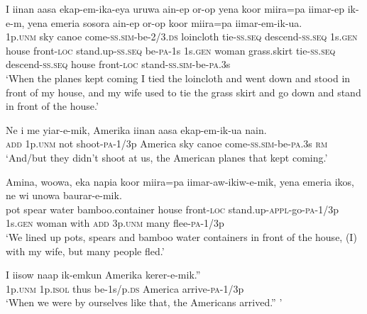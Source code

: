 \ea
\gll  I  iinan  aasa  ekap-em-ika-eya  uruwa  ain-ep             or-op  yena  koor  miira=pa  iimar-ep                     ik-e-m,  yena  emeria  sosora  ain-ep  or-op                        koor  miira=pa  iimar-em-ik-ua. \\
1p.\textsc{unm}  sky  canoe  come-\textsc{ss}.\textsc{sim}-be-2/3.\textsc{ds}  loincloth  tie-\textsc{ss.seq} descend-\textsc{ss.seq}  1s.\textsc{gen}  house  front-\textsc{loc}  stand.up-\textsc{ss.seq} be-\textsc{pa}-1s  1s.\textsc{gen}  woman  grass.skirt  tie-\textsc{ss.seq}  descend-\textsc{ss.seq}    house  front-\textsc{loc}  stand-\textsc{ss}.\textsc{sim}-be-\textsc{pa}.3s \\






\glt ‘When the planes kept coming I tied the loincloth and went down and stood in front of my house, and my wife used to tie the grass skirt and go down and stand in front of the house.’ \\
\z


\ea
\gll  Ne  i  me  yiar-e-mik,  Amerika  iinan  aasa      ekap-em-ik-ua  nain. \\
\textsc{add}  1p.\textsc{unm}  not  shoot-\textsc{pa}-1/3p  America  sky  canoe    come-\textsc{ss}.\textsc{sim}-be-\textsc{pa}.3s  \textsc{rm} \\


\glt ‘And/but they didn’t shoot at us, the American planes that kept coming.’ \\
\z


\ea
\gll  Amina,  woowa,  eka  napia  koor  miira=pa       iimar-aw-ikiw-e-mik,  yena  emeria  ikos,  ne        wi  unowa  baurar-e-mik. \\
pot  spear  water  bamboo.container  house  front-\textsc{loc}  stand.up-\textsc{appl}-go-\textsc{pa}-1/3p  1s.\textsc{gen}  woman  with  \textsc{add}   3p.\textsc{unm}  many  flee-\textsc{pa}-1/3p \\




\glt ‘We lined up pots, spears and bamboo water containers in front of the house, (I) with my wife, but many people fled.’ \\
\z


\ea
\gll  I  iisow  naap  ik-emkun  Amerika  kerer-e-mik.” \\
1p.\textsc{unm}  1p.\textsc{isol}  thus  be-1s/p.\textsc{ds}  America  arrive-\textsc{pa}-1/3p \\
\glt ‘When we were by ourselves like that, the Americans arrived.” ’ \\
\z


